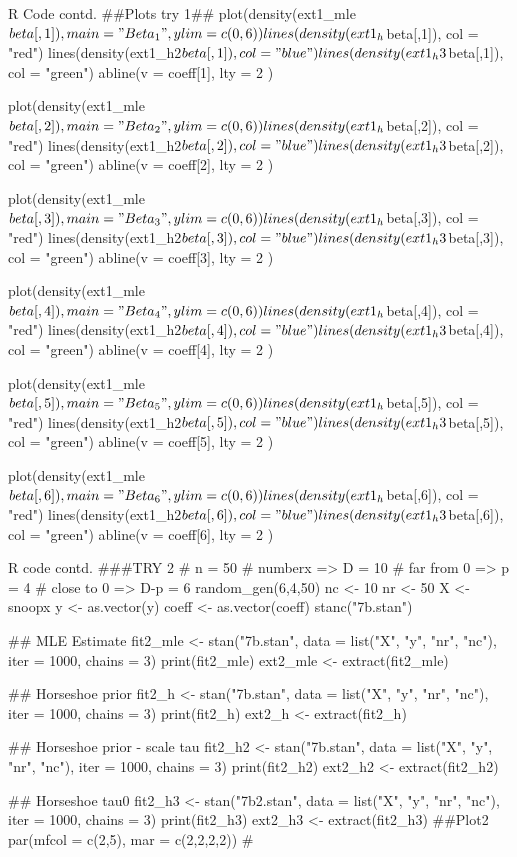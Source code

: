 \documentclass{article}
\begin{document}
 \begin{sexylisting}{R Code contd.}
 ##Plots try 1##
 plot(density(ext1_mle$beta[,1]), main = "Beta_1", ylim = c(0,6))
lines(density(ext1_h$beta[,1]), col = "red")
lines(density(ext1_h2$beta[,1]), col = "blue")
lines(density(ext1_h3$beta[,1]), col = "green")
abline(v = coeff[1], lty = 2 )

plot(density(ext1_mle$beta[,2]), main = "Beta_2", ylim = c(0,6))
lines(density(ext1_h$beta[,2]), col = "red")
lines(density(ext1_h2$beta[,2]), col = "blue")
lines(density(ext1_h3$beta[,2]), col = "green")
abline(v = coeff[2], lty = 2 )

plot(density(ext1_mle$beta[,3]), main = "Beta_3", ylim = c(0,6))
lines(density(ext1_h$beta[,3]), col = "red")
lines(density(ext1_h2$beta[,3]), col = "blue")
lines(density(ext1_h3$beta[,3]), col = "green")
abline(v = coeff[3], lty = 2 )

plot(density(ext1_mle$beta[,4]), main = "Beta_4", ylim = c(0,6))
lines(density(ext1_h$beta[,4]), col = "red")
lines(density(ext1_h2$beta[,4]), col = "blue")
lines(density(ext1_h3$beta[,4]), col = "green")
abline(v = coeff[4], lty = 2 )

plot(density(ext1_mle$beta[,5]), main = "Beta_5", ylim = c(0,6))
lines(density(ext1_h$beta[,5]), col = "red")
lines(density(ext1_h2$beta[,5]), col = "blue")
lines(density(ext1_h3$beta[,5]), col = "green")
abline(v = coeff[5], lty = 2 )

plot(density(ext1_mle$beta[,6]), main = "Beta_6", ylim = c(0,6))
lines(density(ext1_h$beta[,6]), col = "red")
lines(density(ext1_h2$beta[,6]), col = "blue")
lines(density(ext1_h3$beta[,6]), col = "green")
abline(v = coeff[6], lty = 2 )
 \end{sexylisting}
 
\begin{sexylisting}{R code contd.}
###TRY 2
# n = 50
# numberx => D = 10
# far from 0 => p = 4
# close to 0 => D-p = 6
random_gen(6,4,50)
nc <- 10
nr <- 50
X <- snoopx
y <- as.vector(y)
coeff <- as.vector(coeff)
stanc("7b.stan")

## MLE Estimate
fit2_mle <- stan("7b.stan", data = list("X", "y", "nr", "nc"), 
                 iter = 1000, chains = 3)
print(fit2_mle)
ext2_mle <- extract(fit2_mle)

## Horseshoe prior
fit2_h <- stan("7b.stan", data = list("X", "y", "nr", "nc"), 
               iter = 1000, chains = 3)
print(fit2_h)
ext2_h <- extract(fit2_h)

## Horseshoe prior - scale tau
fit2_h2 <- stan("7b.stan", data = list("X", "y", "nr", "nc"), 
                iter = 1000, chains = 3)
print(fit2_h2)
ext2_h2 <- extract(fit2_h2)

## Horseshoe tau0
fit2_h3 <- stan("7b2.stan", data = list("X", "y", "nr", "nc"), 
                iter = 1000, chains = 3)
print(fit2_h3)
ext2_h3 <- extract(fit2_h3)
##Plot2
par(mfcol = c(2,5), mar = c(2,2,2,2))
#
\end{sexylisting}
\end{document}
